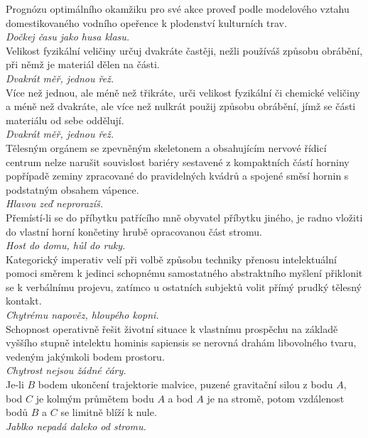 \begin{multicols}{2}
\noindent
Prognózu optimálního okamžiku pro své akce proveď podle modelového
vztahu domestikovaného vodního opeřence k plodenství kulturních
trav.\\[1 mm]
{\sl Dočkej času jako husa klasu.}\\

\noindent
Velikost fyzikální veličiny určuj dvakráte častěji, nežli používáš
způsobu obrábění, při němž je materiál dělen na části.\\[1 mm]
{\sl Dvakrát měř, jednou řež.}\\

\noindent
Více než jednou, ale méně než třikráte, urči velikost fyzikální
či chemické veličiny a méně než dvakráte, ale více než nulkrát
použij způsobu obrábění, jímž se části materiálu od sebe oddělují.\\[1 mm]
{\sl Dvakrát měř, jednou řež.}\\

\noindent
Tělesným orgánem se zpevněným skeletonem a obsahujícím nervové
řídicí centrum nelze narušit souvislost bariéry sestavené z kompaktních
částí horniny popřípadě zeminy zpracované do pravidelných kvádrů a
spojené směsí hornin s podstatným obsahem vápence.\\[1 mm]
{\sl Hlavou zeď neprorazíš.}\\

\noindent
Přemístí-li se do příbytku patřícího mně obyvatel příbytku
jiného, je radno vložiti do vlastní horní končetiny hrubě opracovanou
část stromu.\\[1 mm]
{\sl Host do domu, hůl do ruky.}\\

\noindent
Kategorický imperativ velí při volbě způsobu techniky přenosu
intelektuální pomoci směrem k jedinci schopnému samostatného
abstraktního myšlení přiklonit se k verbálnímu projevu, zatímco
u ostatních subjektů volit přímý prudký tělesný kontakt.\\[1 mm]
{\sl Chytrému napověz, hloupého kopni.}\\

\noindent
Schopnost operativně řešit životní situace k vlastnímu prospěchu
na základě vyššího stupně intelektu hominis sapiensis se nerovná
drahám libovolného tvaru, vedeným jakýmkoli bodem prostoru.\\[1 mm]
{\sl Chytrost nejsou žádné čáry.}\\

\noindent
Je-li $B$ bodem ukončení trajektorie malvice, puzené gravitační
silou z bodu $A$, bod $C$ je kolmým průmětem bodu $A$ a bod $A$ je
na stromě,
potom vzdálenost bodů $B$ a $C$ se limitně blíží
k nule.\\[1 mm]
{\sl Jablko nepadá daleko od stromu.}\\


\end{multicols}
